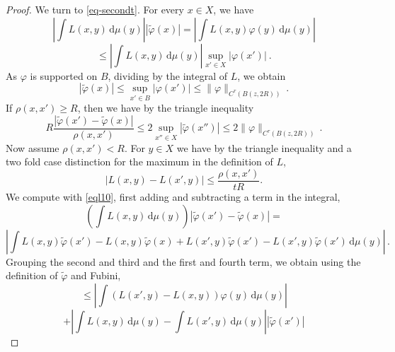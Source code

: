 \begin{proof}
We turn to \eqref{eq-secondt}. For every $x\in X$, we have
\begin{equation}
    \left|\int L(x,y) \, \mathrm{d}\mu(y)\right||\tilde{\varphi}(x)|
    =\left|\int L(x,y) {\varphi}(y)\, \mathrm{d}\mu(y)\right|
\end{equation}
 \begin{equation}
    \le \left|\int L(x,y) \, \mathrm{d}\mu(y)\right| \sup_{x'\in X}
    |{\varphi}(x')|\ .
\end{equation}
As $\varphi$ is supported on $B$, dividing by the integral of $L$, we obtain
\begin{equation}\label{eql42}
 |\tilde{\varphi}(x)|\le \sup_{x'\in B}
    |{\varphi}(x')|\le \|\varphi\|_{C^\tau(B(z, 2R))}\ .
\end{equation}
If $\rho(x,x')\ge R$, then we have by the triangle inequality
  \begin{equation}\label{eql52}
 R\frac{|\tilde{\varphi}(x') - \tilde \varphi(x)|}{\rho(x,x')} \le
 2\sup_{x''\in X} |\tilde{\varphi}(x'')|\le 2\|\varphi\|_{C^\tau(B(z, 2R))}\, .
\end{equation}
Now assume $\rho(x,x')< R$. For $y\in X$ we have by the triangle inequality and a two fold case distinction
for the maximum in the definition of $L$,
\begin{equation}\label{eql10}
   |L(x,y) - L(x',y)| \le \frac{\rho(x,x')}{tR}.
\end{equation}
We compute with \eqref{eql10}, first adding and subtracting a term in the integral,
\begin{equation}
    \left(\int L(x,y) \, \mathrm{d}\mu(y)\right)
    |\tilde{\varphi}(x') - \tilde \varphi(x)|=
\end{equation}
\begin{equation}
    \left|\int L(x,y) \tilde{\varphi}(x')
    -L(x,y) \tilde{\varphi}(x)
    +L(x',y) \tilde{\varphi}(x')-
     L(x',y) \tilde{\varphi}(x')
    \, \mathrm{d}\mu(y)\right|\,.
\end{equation}
Grouping the second and third and the first and fourth term, we obtain using the definition of $\tilde \varphi$ and Fubini,
\begin{equation}\label{eql21}
    \le \left| \int (L(x',y)-L(x,y)) \varphi(y) \, \mathrm{d}\mu(y)\right|
\end{equation}
\begin{equation}\label{eql22}
    + \left| \int L(x,y) \, \mathrm{d}\mu(y)-\int L(x',y) \, \mathrm{d}\mu(y)\right||\tilde{\varphi}(x')|
\end{equation}
\begin{equation}\label{eql23}

\end{equation}
\end{proof}
